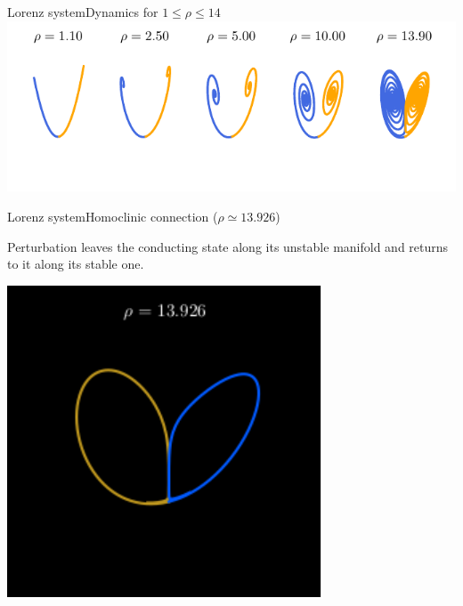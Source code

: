 \documentclass[usenames, dvipsnames, aspectratio=169]{beamer}
\begin{document}
{



  \begin{frame}[t, c]{Lorenz system}{Dynamics for $1 \leq \rho \leq 14$}
    \vfill
    \centering
    \large
    \includegraphics[width=\textwidth]{primary_bifurcation_phase_plots}
    \vfill
  \end{frame}

}

\begin{frame}[t, c]{Lorenz system}{Homoclinic connection ($\rho \simeq 13.926$)}
  \vfill
  \large

  \begin{minipage}{.48\textwidth}
    Perturbation leaves the conducting state along its unstable manifold and returns to it along its stable one.
  \end{minipage}%
  \hfill
  \begin{minipage}{.48\textwidth}
    \centering
    \includegraphics[width=\textwidth]{homoclinic_connection}
  \end{minipage}

  \vfill
\end{frame}
\end{document}
